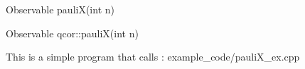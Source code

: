 
\begin{apidefinition}

\begin{Csynopsis}
    Observable pauliX(int n)
\end{Csynopsis}

\begin{Cppsynopsis}
    Observable qcor::pauliX(int n)
\end{Cppsynopsis}


\begin{apiarguments}
\end{apiarguments}



\apinotes{
    
}

\begin{apiexamples}

\apicppexample
    { This is a simple program that calls : } 
    { example_code/pauliX_ex.cpp} 
    {}

\end{apiexamples}

\end{apidefinition}
